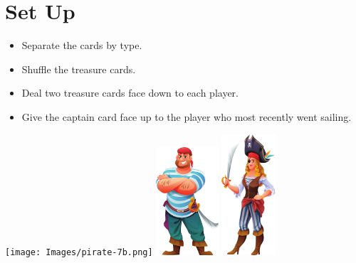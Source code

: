 \section*{Set Up}
\begin{itemize}[leftmargin=*]
\item Separate the cards by type.
\item Shuffle the treasure cards.
\item Deal two treasure cards face down to each player.
\item Give the captain card face up to the player who most recently went sailing. %
\end{itemize}

\bigskip

\bigskip

\begin{center}

\texttt{[image: Images/pirate-7b.png]}
\qquad
\includegraphics[height=4cm]{Images/pirate-1.png}
\qquad
\includegraphics[height=4.5cm]{Images/pirate-2.png}

\end{center}